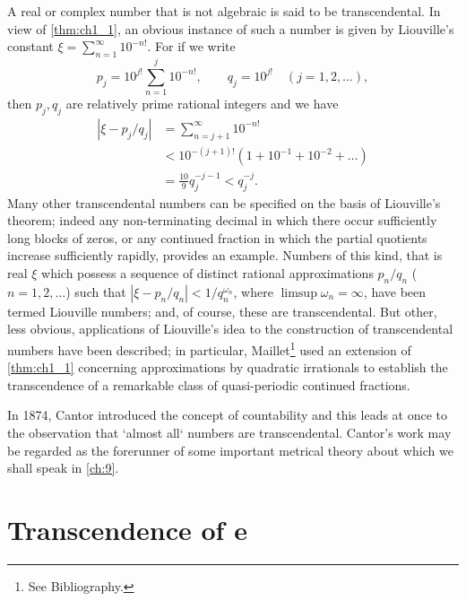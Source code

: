 A real or complex number that is not algebraic is said to be transcendental. In view of \autoref{thm:ch1_1}, an obvious instance of such a number is given by Liouville's constant $\xi = \sum_{n=1}^{\infty} 10^{-n!}$. For if we write
\[
p_j = 10^{j!} \sum_{n=1}^{j} 10^{-n!}, \qquad q_j = 10^{j!} \quad (j = 1, 2, \dots),
\]
then $p_j, q_j$ are relatively prime rational integers and we have
\begin{align*}
|\xi - p_j/q_j| &= \sum_{n=j+1}^{\infty} 10^{-n!} \\
&< 10^{-(j+1)!} (1 + 10^{-1} + 10^{-2} + \dots) \\
&= \frac{10}{9} q_j^{-j-1} < q_j^{-j}.
\end{align*}
Many other transcendental numbers can be specified on the basis of Liouville's theorem; indeed any non-terminating decimal in which there occur sufficiently long blocks of zeros, or any continued fraction in which the partial quotients increase sufficiently rapidly, provides an example. Numbers of this kind, that is real $\xi$ which possess a sequence of distinct rational approximations $p_n/q_n$ ($n=1,2,\dots$) such that $|\xi - p_n/q_n| < 1/q_n^{\omega_n}$, where $\limsup \omega_n = \infty$, have been termed Liouville numbers; and, of course, these are transcendental. But other, less obvious, applications of Liouville's idea to the construction of transcendental numbers have been described; in particular, Maillet\footnote{See Bibliography.} used an extension of \autoref{thm:ch1_1} concerning approximations by quadratic irrationals to establish the transcendence of a remarkable class of quasi-periodic continued fractions.

In 1874, Cantor introduced the concept of countability and this leads at once to the observation that `almost all` numbers are transcendental. Cantor's work may be regarded as the forerunner of some important metrical theory about which we shall speak in \autoref{ch:9}.


\section{Transcendence of e}

